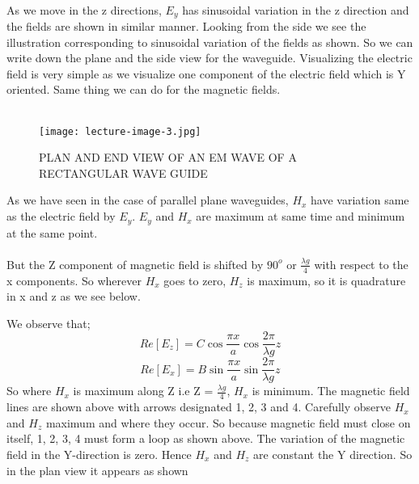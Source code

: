 	
\paragraph{}
	As we move in the z directions, $E_{y}$ has sinusoidal variation in the z direction and the fields are shown in similar manner. Looking from the side we see the illustration corresponding to sinusoidal variation of the fields as shown. 
	So we can write down the plane and the side view for the waveguide.
	Visualizing the electric field is very simple as we visualize one component of the electric field which is Y oriented. Same thing we can do for the magnetic fields.\\\\
	
	\begin{figure}[H]
		\centering
		\texttt{[image: lecture-image-3.jpg]}
		\caption{PLAN AND END VIEW OF AN EM WAVE OF A RECTANGULAR WAVE GUIDE}
	\end{figure}
	
	 As we have seen in the case of parallel plane waveguides, $H_{x}$ have variation same as the electric field by $E_{y}$. $E_{y}$ and $H_{x}$ are maximum at same time and minimum at the same point.\\\\
	But the Z component of magnetic field is shifted by $90^{o}$ or $\frac{\lambda g}{4}$ with respect to the x components. So wherever $H_{x}$
	goes to zero, $H_{z}$ is maximum, so it is quadrature in x and z as we see below.
		
	We observe that;
\begin{equation}
	Re[E_{z}] = C\cos\dfrac{\pi x}{a}\cos\dfrac{2\pi}{\lambda g}z
\end{equation}
\begin{equation}
	Re[E_{x}] = B\sin\dfrac{\pi x}{a} \sin\dfrac{2\pi}{\lambda g}z
\end{equation}
	So where $H_{x}$ is maximum along Z i.e Z = $\frac{\lambda g}{4}$, $H_{x}$ is minimum.
	The magnetic field lines are shown above with arrows designated 1, 2, 3 and 4. Carefully observe $H_{x}$ and $H_{z}$ maximum and where they occur. So because magnetic field must close on itself, 1, 2, 3, 4 must form a loop as shown above.
	The variation of the magnetic field in the Y-direction is zero. Hence $H_{x}$ and $H_{z}$ are constant the Y direction. So in the plan view it appears as shown \\\\
	
